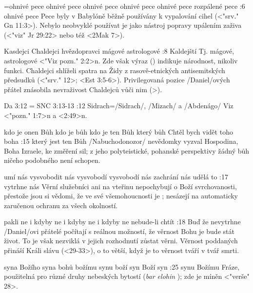 ={ohnivé pece} %
    {ohnivé pece} %
    {ohnivé pece} %
    {ohnivé pece} %
    {ohnivé pece} %
    {rozpálené pece} %
:6 {ohnivé pece} Pece byly v Babylóně běžně používány k vypalování cihel  (<"srv." Gn 11:3>). Nebylo neobvyklé používat je jako nástroj popravy upálením zaživa (<"viz" Jr 29:22> nebo též <2Mak 7>).  

    {Kasdejci} %
    {Chaldejci}  %
    {hvězdopravci} %
    {mágové}  %
    {astrologové}  %
:8 {Kaldejští} Tj. mágové, astrologové <"Viz pozn." 2:2>n.   
 Zde však výraz  (\Kasdain) indikuje národnost, nikoliv funkci. Chaldejci shlíželi spatra na Židy z rasově-etnických antisemitských předsudků (<"srv." 12>; <Est 3:5-6>). 
 Privilegovaná pozice \x/Daniel/ových přátel znásobila nevraživost Chaldejců vůči nim (>).

\renum Da 3:12 = SNC 3:13-13
:12 {Sidrach}={\x/Sidrach/, \x/Mizach/ a \x/Abdenágo/} Viz <"pozn." 1:7>n a <2:49>n. 

    {kdo je onen Bůh} %
    {kdo je bůh}  %
    {kdo je ten Bůh} %
    {který bůh}  %
    {Chtěl bych vidět toho boha}  %
:15 {který jest ten Bůh} \x/Nabuchodonozor/ nevědomky vyzval Hospodina, Boha Izraele, ke změření sil; z jeho polyteistické, pohanské perspektivy žádný bůh ničeho podobného není schopen.


    {umí nás vysvobodit} %
    {nás vysvobodí}  %
    {vysvobodí nás} %
    {zachrání nás}  %
    {udělá to}  %
:17  {vytrhne nás} Věrní služebníci ani na vteřinu nepochybují o Boží svrchovanosti, přestože jsou si vědomi, že ve své všemohoucnosti je ; nesázejí na automaticky zaručenou ochranu za všech okolností. 

    {pakli ne} %
    {i kdyby ne}  %
    {i kdyby ne} %
    {i kdyby ne}  %
    {nebude-li chtít}  %
:18 {Buď že nevytrhne} \x/Daniel/ovi přátelé počítají s reálnou možností, že věrnost Bohu je bude stát život. To je však nezviklá v jejich rozhodnutí zůstat věrni. Věrnost poddaných přináší Králi slávu (<29-33>), o to větší, když je to věrnost tváří v tvář smrti.

    {syna Božího} %
    {syna bohů}  %
    {božímu synu} %
    {boží syn}  %
    {Boží syn}  %
:25 {synu Božímu} Fráze, použitelná pro různé druhy nebeských bytostí ({\it bar elohin\/} \BarElohin); zde je míněn  <"verše" 28>.

